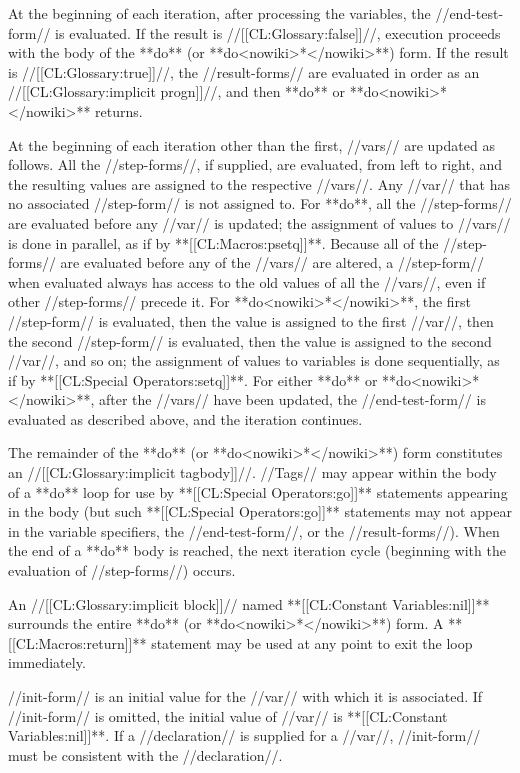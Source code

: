 At the beginning of each iteration, after processing the variables, the //end-test-form// is evaluated. If the result is //[[CL:Glossary:false]]//, execution proceeds with the body of the **do** (or **do<nowiki>*</nowiki>**) form. If the result is //[[CL:Glossary:true]]//, the //result-forms// are evaluated in order as an //[[CL:Glossary:implicit progn]]//, and then **do** or **do<nowiki>*</nowiki>** returns.

At the beginning of each iteration other than the first, //vars// are updated as follows. All the //step-forms//, if supplied, are evaluated, from left to right, and the resulting values are assigned to the respective //vars//. Any //var// that has no associated //step-form// is not assigned to. For **do**, all the //step-forms// are evaluated before any //var// is updated; the assignment of values to //vars// is done in parallel, as if by **[[CL:Macros:psetq]]**. Because all of the //step-forms// are evaluated before any of the //vars// are altered, a //step-form// when evaluated always has access to the old values of all the //vars//, even if other //step-forms// precede it. For **do<nowiki>*</nowiki>**, the first //step-form// is evaluated, then the value is assigned to the first //var//, then the second //step-form// is evaluated, then the value is assigned to the second //var//, and so on; the assignment of values to variables is done sequentially, as if by **[[CL:Special Operators:setq]]**. For either **do** or **do<nowiki>*</nowiki>**, after the //vars// have been updated, the //end-test-form// is evaluated as described above, and the iteration continues.

The remainder of the **do** (or **do<nowiki>*</nowiki>**) form constitutes an //[[CL:Glossary:implicit tagbody]]//. //Tags// may appear within the body of a **do** loop for use by **[[CL:Special Operators:go]]** statements appearing in the body (but such **[[CL:Special Operators:go]]** statements may not appear in the variable specifiers, the //end-test-form//, or the //result-forms//). When the end of a **do** body is reached, the next iteration cycle (beginning with the evaluation of //step-forms//) occurs.

An //[[CL:Glossary:implicit block]]// named **[[CL:Constant Variables:nil]]** surrounds the entire **do** (or **do<nowiki>*</nowiki>**) form. A **[[CL:Macros:return]]** statement may be used at any point to exit the loop immediately.

//init-form// is an initial value for the //var// with which it is associated. If //init-form// is omitted, the initial value of //var// is **[[CL:Constant Variables:nil]]**. If a //declaration// is supplied for a //var//, //init-form// must be consistent with the //declaration//.

